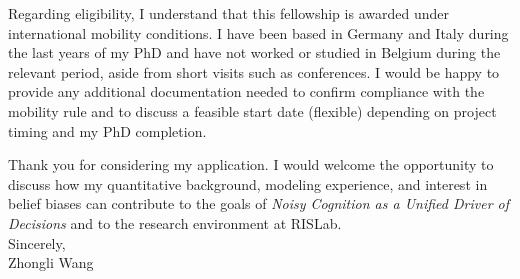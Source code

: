 \documentclass[11pt]{article}
\begin{document}
Regarding eligibility, I understand that this fellowship is awarded under international mobility conditions. I have been based in Germany and Italy during the last years of my PhD and have not worked or studied in Belgium during the relevant period, aside from short visits such as conferences. I would be happy to provide any additional documentation needed to confirm compliance with the mobility rule and to discuss a feasible start date (flexible) depending on project timing and my PhD completion.

Thank you for considering my application. I would welcome the opportunity to discuss how my quantitative background, modeling experience, and interest in belief biases can contribute to the goals of \textit{Noisy Cognition as a Unified Driver of Decisions} and to the research environment at RISLab.\\[3mm]

\noindent Sincerely,\\[12mm]
\noindent Zhongli Wang

\vspace{4mm}

\end{document}
